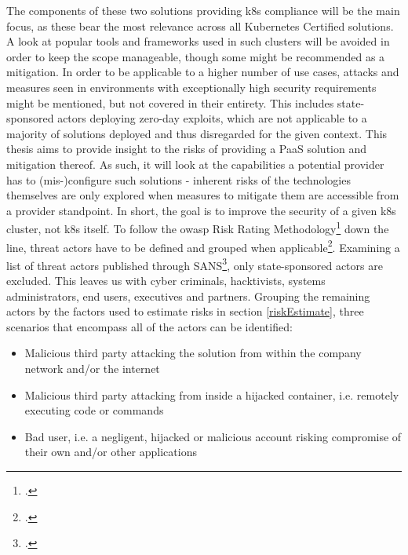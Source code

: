 The components of these two solutions providing \gls{k8s} compliance will be the main focus, as these bear the most relevance across all Kubernetes Certified solutions. 
A look at popular tools and frameworks used in such clusters will be avoided in order to keep the scope manageable, though some might be recommended as a mitigation.
In order to be applicable to a higher number of use cases, attacks and measures seen in environments with exceptionally high security requirements might be mentioned, but not  covered in their entirety. This includes state-sponsored actors deploying zero-day exploits, which are not applicable to a majority of solutions deployed and thus disregarded for the given context.
This thesis aims to provide insight to the risks of providing a PaaS solution and mitigation thereof. 
As such, it will look at the capabilities a potential provider has to (mis-)configure such solutions - inherent risks of the technologies themselves are only explored when measures to mitigate them are accessible from a provider standpoint. 
In short, the goal is to improve the security of a given \gls{k8s} cluster, not \gls{k8s} itself.
To follow the \gls{owasp} Risk Rating Methodology\footcite{riskRating} down the line, threat actors have to be defined and grouped when applicable\footcite[][, Section 'Define all possible threats']{threatModeling}. Examining a list of threat actors published through SANS\footcite[][p. 12 to 17]{sansThreatActors}, only state-sponsored actors are excluded. This leaves us with cyber criminals, hacktivists, systems administrators, end users, executives and partners.
Grouping the remaining actors by the factors used to estimate risks in section \ref{riskEstimate}, three scenarios that encompass all of the actors can be identified:
\begin{itemize}

\item Malicious third party attacking the solution from within the company network and/or the internet

\item Malicious third party attacking from inside a hijacked container, i.e. remotely executing code or commands

\item Bad user, i.e. a negligent, hijacked or malicious account risking compromise of their own and/or other applications

\end{itemize}

